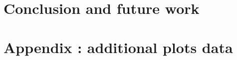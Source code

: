 \documentclass{template/EPL-master-thesis-covers-EN}
\begin{document}
     


\chapter{Conclusion and future work} \label{ch:conclusion}

    

\chapter*{Appendix : additional plots data} \label{ch:appendix-plots-data}
\setcounter{page}{1}

     

\printbibliography[heading=bibintoc]

\backcoverpage
\end{document}

